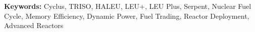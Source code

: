 




\textbf{Keywords:} Cyclus, TRISO, HALEU, LEU+, LEU Plus, Serpent, Nuclear Fuel Cycle, Memory Efficiency, Dynamic Power, Fuel Trading, Reactor Deployment, Advanced Reactors